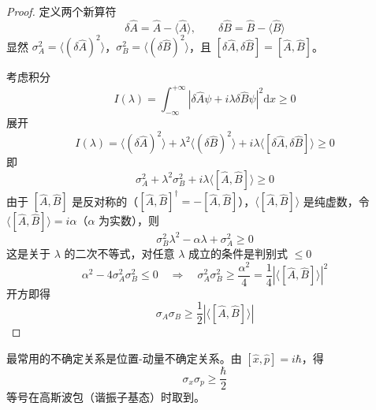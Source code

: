 \begin{proof}
    定义两个新算符
    \begin{equation}
        \delta\hat{A} = \hat{A} - \langle \hat{A} \rangle, \qquad \delta\hat{B} = \hat{B} - \langle \hat{B} \rangle
    \end{equation}
    显然 $\sigma_A^2 = \langle (\delta\hat{A})^2 \rangle$，$\sigma_B^2 = \langle (\delta\hat{B})^2 \rangle$，且 $[\delta\hat{A}, \delta\hat{B}] = [\hat{A}, \hat{B}]$。

    考虑积分
    \begin{equation}
        I(\lambda) = \int_{-\infty}^{+\infty} |\delta\hat{A}\psi + i\lambda\delta\hat{B}\psi|^2 \mathrm{d}x \geqslant 0
    \end{equation}
    展开
    \begin{equation}
        I(\lambda) = \langle (\delta\hat{A})^2 \rangle + \lambda^2\langle (\delta\hat{B})^2 \rangle + i\lambda\langle [\delta\hat{A}, \delta\hat{B}] \rangle \geqslant 0
    \end{equation}
    即
    \begin{equation}
        \sigma_A^2 + \lambda^2\sigma_B^2 + i\lambda\langle [\hat{A}, \hat{B}] \rangle \geqslant 0
    \end{equation}
    由于 $[\hat{A}, \hat{B}]$ 是反对称的（$[\hat{A}, \hat{B}]^\dagger = -[\hat{A}, \hat{B}]$），$\langle [\hat{A}, \hat{B}] \rangle$ 是纯虚数，令 $\langle [\hat{A}, \hat{B}] \rangle = i\alpha$（$\alpha$ 为实数），则
    \begin{equation}
        \sigma_B^2\lambda^2 - \alpha\lambda + \sigma_A^2 \geqslant 0
    \end{equation}
    这是关于 $\lambda$ 的二次不等式，对任意 $\lambda$ 成立的条件是判别式 $\leqslant 0$
    \begin{equation}
        \alpha^2 - 4\sigma_A^2\sigma_B^2 \leqslant 0 \quad \Longrightarrow \quad \sigma_A^2\sigma_B^2 \geqslant \frac{\alpha^2}{4} = \frac{1}{4}|\langle [\hat{A}, \hat{B}] \rangle|^2
    \end{equation}
    开方即得
    \begin{equation}
        \sigma_A\sigma_B \geqslant \frac{1}{2}|\langle [\hat{A}, \hat{B}] \rangle|
    \end{equation}
\end{proof}

\begin{remark}
    最常用的不确定关系是位置-动量不确定关系。由 $[\hat{x}, \hat{p}] = i\hbar$，得
    \begin{equation}
        \sigma_x\sigma_p \geqslant \frac{\hbar}{2}
    \end{equation}
    等号在高斯波包（谐振子基态）时取到。
\end{remark}

